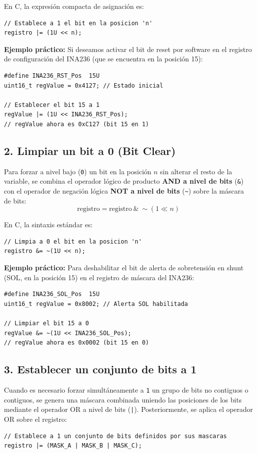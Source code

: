 \documentclass[
10pt, %
a4paper, %
oneside, %
headinclude,footinclude, %
BCOR5mm, %
]{scrartcl}
\begin{document}
En C, la expresión compacta de asignación es:
\begin{lstlisting}[style=CMakeStyle]
// Establece a 1 el bit en la posicion 'n'
registro |= (1U << n);
\end{lstlisting}

\textbf{Ejemplo práctico:}
Si deseamos activar el bit de reset por software en el registro de configuración del INA236 (que se encuentra en la posición 15):
\begin{lstlisting}[style=CMakeStyle]
#define INA236_RST_Pos  15U
uint16_t regValue = 0x4127; // Estado inicial

// Establecer el bit 15 a 1
regValue |= (1U << INA236_RST_Pos); 
// regValue ahora es 0xC127 (bit 15 en 1)
\end{lstlisting}

\subsection*{2. Limpiar un bit a 0 (Bit Clear)}
Para forzar a nivel bajo (\texttt{0}) un bit en la posición $n$ sin alterar el resto de la variable, se combina el operador lógico de producto \textbf{AND a nivel de bits} (\texttt{\&}) con el operador de negación lógica \textbf{NOT a nivel de bits} (\texttt{\~{}}) sobre la máscara de bits:
\begin{equation}
	\text{registro} = \text{registro} \ \& \ \sim(1 \ll n)
\end{equation}

En C, la sintaxis estándar es:
\begin{lstlisting}[style=CMakeStyle]
// Limpia a 0 el bit en la posicion 'n'
registro &= ~(1U << n);
\end{lstlisting}

\textbf{Ejemplo práctico:}
Para deshabilitar el bit de alerta de sobretensión en shunt (SOL, en la posición 15) en el registro de máscara del INA236:
\begin{lstlisting}[style=CMakeStyle]
#define INA236_SOL_Pos  15U
uint16_t regValue = 0x8002; // Alerta SOL habilitada

// Limpiar el bit 15 a 0
regValue &= ~(1U << INA236_SOL_Pos);
// regValue ahora es 0x0002 (bit 15 en 0)
\end{lstlisting}

\subsection*{3. Establecer un conjunto de bits a 1}
Cuando es necesario forzar simultáneamente a \texttt{1} un grupo de bits no contiguos o contiguos, se genera una máscara combinada uniendo las posiciones de los bits mediante el operador OR a nivel de bits (\texttt{|}). Posteriormente, se aplica el operador OR sobre el registro:
\begin{lstlisting}[style=CMakeStyle]
// Establece a 1 un conjunto de bits definidos por sus mascaras
registro |= (MASK_A | MASK_B | MASK_C);
\end{lstlisting}
\end{document}
